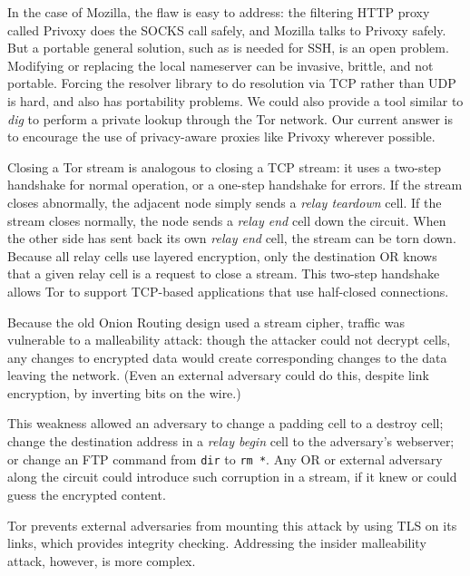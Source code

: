 \documentclass[times,10pt,twocolumn]{article}
\begin{document}
In the case of Mozilla, the flaw is easy to address: the filtering HTTP
proxy called Privoxy does the SOCKS call safely, and Mozilla talks to
Privoxy safely. But a portable general solution, such as is needed for
SSH, is
an open problem. Modifying or replacing the local nameserver
can be invasive, brittle, and not portable. Forcing the resolver
library to do resolution via TCP rather than UDP is
hard, and also has portability problems. We could also provide a
tool similar to \emph{dig} to perform a private lookup through the
Tor network. Our current answer is to encourage the use of
privacy-aware proxies like Privoxy wherever possible.

Closing a Tor stream is analogous to closing a TCP stream: it uses a
two-step handshake for normal operation, or a one-step handshake for
errors. If the stream closes abnormally, the adjacent node simply sends a
\emph{relay teardown} cell. If the stream closes normally, the node sends
a \emph{relay end} cell down the circuit. When the other side has sent
back its own \emph{relay end} cell, the stream can be torn down.  Because
all relay cells use layered encryption, only the destination OR knows
that a given relay cell is a request to close a stream.  This two-step
handshake allows Tor to support TCP-based applications that use half-closed
connections.

\label{subsec:integrity-checking}

Because the old Onion Routing design used a stream cipher, traffic was
vulnerable to a malleability attack: though the attacker could not
decrypt cells, any changes to encrypted data
would create corresponding changes to the data leaving the network.
(Even an external adversary could do this, despite link encryption, by
inverting bits on the wire.)

This weakness allowed an adversary to change a padding cell to a destroy
cell; change the destination address in a \emph{relay begin} cell to the
adversary's webserver; or change an FTP command from
{\tt dir} to {\tt rm~*}. Any OR or external adversary
along the circuit could introduce such corruption in a stream, if it
knew or could guess the encrypted content.

Tor prevents external adversaries from mounting this attack by
using TLS on its links, which provides integrity checking.
Addressing the insider malleability attack, however, is
more complex.
\end{document}
